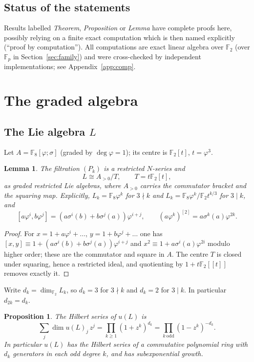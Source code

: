 \documentclass[11pt]{amsart}
\newtheorem{proposition}[theorem]{Proposition}
\newtheorem{lemma}[theorem]{Lemma}
\theoremstyle{definition}
\newcommand{\F}{\mathbb{F}}
\begin{document}
\subsection*{Status of the statements}
Results labelled \emph{Theorem}, \emph{Proposition} or \emph{Lemma} have complete proofs here, possibly relying on a
finite exact computation which is then named explicitly (``proof by computation''). All computations are exact
linear algebra over $\F_2$ (over $\F_p$ in Section~\ref{sec:family}) and were cross-checked by independent implementations; see Appendix~\ref{app:comp}.

\section{The graded algebra}\label{sec:graded}

\subsection{The Lie algebra $L$}
Let $A=\F_8[\varphi;\sigma]$ (graded by $\deg\varphi=1$); its centre is $\F_2[t]$, $t=\varphi^3$.

\begin{lemma}\label{lem:L}
The filtration $(P_k)$ is a restricted $N$-series and
\[
  L\cong A_{>0}/T,\qquad T=t\F_2[t],
\]
as graded restricted Lie algebras, where $A_{>0}$ carries the commutator bracket and the squaring map. Explicitly,
$L_k=\F_8\varphi^k$ for $3\nmid k$ and $L_k=\F_8\varphi^k/\F_2t^{k/3}$ for $3\mid k$, and
\[
  [a\varphi^i,b\varphi^j]=(a\sigma^i(b)+b\sigma^j(a))\varphi^{i+j},\qquad (a\varphi^k)^{[2]}=a\sigma^k(a)\varphi^{2k}.
\]
\end{lemma}

\begin{proof}
For $x=1+a\varphi^i+\dots$, $y=1+b\varphi^j+\dots$ one has $[x,y]\equiv 1+(a\sigma^i(b)+b\sigma^j(a))\varphi^{i+j}$ and
$x^2\equiv 1+a\sigma^i(a)\varphi^{2i}$ modulo higher order; these are the commutator and square in $A$. The centre
$T$ is closed under squaring, hence a restricted ideal, and quotienting by $1+t\F_2[[t]]$ removes exactly it.
\end{proof}

Write $d_k=\dim_{\F_2}L_k$, so $d_k=3$ for $3\nmid k$ and $d_k=2$ for $3\mid k$. In particular $d_{2k}=d_k$.

\begin{proposition}\label{prop:hilbert}
The Hilbert series of $u(L)$ is
\[
  \sum_j\dim u(L)_j\,z^j=\prod_{k\ge1}(1+z^k)^{d_k}=\prod_{k\ \mathrm{odd}}(1-z^k)^{-d_k}.
\]
In particular $u(L)$ has the Hilbert series of a commutative polynomial ring with $d_k$ generators in each odd
degree $k$, and has subexponential growth.
\end{proposition}
\end{document}
